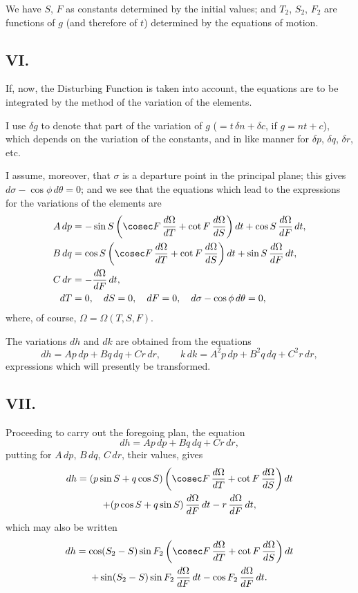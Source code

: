 \documentclass[11pt,a4paper]{book}
\begin{document}
{{We have $S$, $F$ as constants determined by the initial values; and $T_2$, $S_2$, $F_2$ are functions of $g$ (and therefore of $t$) determined by the equations of motion.

\subsection*{VI.}

If, now, the Disturbing Function is taken into account, the equations are to be integrated by the method of the variation of the elements.

I use $\delta g$ to denote that part of the variation of $g$ ($= t\,\delta n + \delta c$, if $g = nt + c$), which depends on the variation of the constants, and in like manner for $\delta p$, $\delta q$, $\delta r$, etc.

I assume, moreover, that $\sigma$ is a departure point in the principal plane; this gives $d\sigma - \cos\phi\,d\theta = 0$; and we see that the equations which lead to the expressions for the variations of the elements are
\begin{align*}
A\,dp &= -\sin S\left(\cosec F\,\frac{d\Omega}{dT} + \cot F\,\frac{d\Omega}{dS}\right)dt + \cos S\,\frac{d\Omega}{dF}\,dt, \\
B\,dq &= \cos S\left(\cosec F\,\frac{d\Omega}{dT} + \cot F\,\frac{d\Omega}{dS}\right)dt + \sin S\,\frac{d\Omega}{dF}\,dt, \\
C\,dr &= -\frac{d\Omega}{dF}\,dt, \\
dT &= 0, \quad dS = 0, \quad dF = 0, \quad d\sigma - \cos\phi\,d\theta = 0,
\end{align*}
where, of course, $\Omega = \Omega(T, S, F)$.

The variations $dh$ and $dk$ are obtained from the equations
\[
dh = Ap\,dp + Bq\,dq + Cr\,dr, \qquad k\,dk = A^2p\,dp + B^2q\,dq + C^2r\,dr,
\]
expressions which will presently be transformed.

\subsection*{VII.}

Proceeding to carry out the foregoing plan, the equation
\[
dh = Ap\,dp + Bq\,dq + Cr\,dr,
\]
putting for $A\,dp$, $B\,dq$, $C\,dr$, their values, gives
\begin{multline}
dh = (p\sin S + q\cos S)\left(\cosec F\,\frac{d\Omega}{dT} + \cot F\,\frac{d\Omega}{dS}\right)dt \\
+ (p\cos S + q\sin S)\,\frac{d\Omega}{dF}\,dt - r\,\frac{d\Omega}{dF}\,dt,
\end{multline}
which may also be written
\begin{multline}
dh = \cos(S_2-S)\sin F_2\left(\cosec F\,\frac{d\Omega}{dT} + \cot F\,\frac{d\Omega}{dS}\right)dt \\
+ \sin(S_2-S)\sin F_2\,\frac{d\Omega}{dF}\,dt - \cos F_2\,\frac{d\Omega}{dF}\,dt.
\end{multline}

}}
\end{document}
